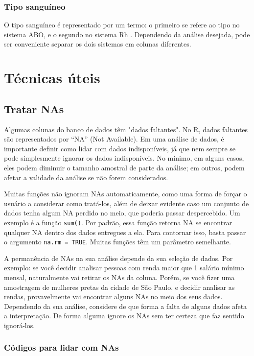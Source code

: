 \documentclass{book}
\begin{document}
\subsection{Tipo sanguíneo}
O tipo sanguíneo é representado por um termo: o primeiro se refere ao tipo no sistema ABO, e o segundo no sistema Rh . Dependendo da análise desejada, pode ser conveniente separar os dois sistemas em colunas diferentes.

\chapter{Técnicas úteis}
\section{Tratar NAs}
Algumas colunas do banco de dados têm "dados faltantes". No R, dados faltantes são representados por ``NA'' (Not Available). Em uma análise de dados, é importante definir como lidar com dados indisponíveis, já que nem sempre se pode simplesmente ignorar os dados indisponíveis. No mínimo, em alguns casos, eles podem diminuir o tamanho amostral de parte da análise; em outros, podem afetar a validade da análise se não forem considerados.
\par
Muitas funções não ignoram NAs automaticamente, como uma forma de forçar o usuário a considerar como tratá-los, além de deixar evidente caso um conjunto de dados tenha algum NA perdido no meio, que poderia passar despercebido. Um exemplo é a função \texttt{sum()}. Por padrão, essa função retorna NA se encontrar qualquer NA dentro dos dados entregues a ela. Para contornar isso, basta passar o argumento \texttt{na.rm = TRUE}. Muitas funções têm um parâmetro semelhante.
\par
A permanência de NAs na sua análise depende da sua seleção de dados. Por exemplo: se você decidir analisar pessoas com renda maior que 1 salário mínimo mensal, naturalmente vai retirar os NAs da coluna. Porém, se você fizer uma amostragem de mulheres pretas da cidade de São Paulo, e decidir analisar as rendas, provavelmente vai encontrar alguns NAs no meio dos seus dados. Dependendo da sua análise, considere de que forma a falta de alguns dados afeta a interpretação. De forma alguma ignore os NAs sem ter certeza que faz sentido ignorá-los.

\subsection{Códigos para lidar com NAs}
\end{document}
